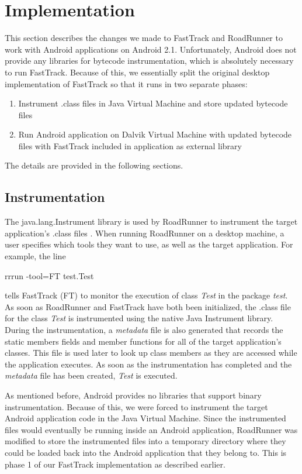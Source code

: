 \documentclass{acm_proc_article-sp}
\begin{document}
\section{Implementation}
This section describes the changes we made to FastTrack and RoadRunner to work with Android applications on Android 2.1. Unfortunately, Android does not provide any libraries for bytecode instrumentation, which is absolutely necessary to run FastTrack. Because of this, we essentially split the original desktop implementation of FastTrack so that it runs in two separate phases:

\begin{enumerate}
\item Instrument .class files in Java Virtual Machine and store updated bytecode files
\item Run Android application on Dalvik Virtual Machine with updated bytecode files with FastTrack included in application as external library
\end{enumerate}

The details are provided in the following sections.


\subsection{Instrumentation}
The java.lang.Instrument library is used by RoadRunner to instrument the target application's .class files \cite{Flanagan2009}. When running RoadRunner on a desktop machine, a user specifies which tools they want to use, as well as the target application. For example, the line 
\begin{code}
	rrrun -tool=FT test.Test
\end{code}
tells FastTrack (FT) to monitor the execution of class \emph{Test} in the package \emph{test}. As soon as RoadRunner and FastTrack have both been initialized, the .class file for the class \emph{Test} is instrumented using the native Java Instrument library. During the instrumentation, a \emph{metadata} file is also generated that records the static members fields and member functions for all of the target application's classes. This file is used later to look up class members as they are accessed while the application executes. As soon as the instrumentation has completed and the \emph{metadata} file has been created, \emph{Test} is executed. 

As mentioned before, Android provides no libraries that support binary instrumentation. Because of this, we were forced to instrument the target Android application code in the Java Virtual Machine. Since the instrumented files would eventually be running inside an Android application, RoadRunner was modified to store the instrumented files into a temporary directory where they could be loaded back into the Android application that they belong to. This is phase 1 of our FastTrack implementation as described earlier.
\end{document}
